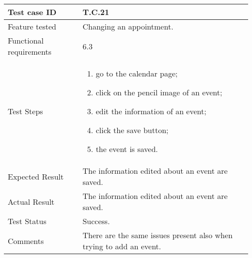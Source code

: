\begin{table}[H]
	\begin{center}
		\begin{tabular}{ | p{} | p{} | }
		\hline
		Test case ID & T.C.21\\
		\hline
		Feature tested & Changing an appointment.\\
    	\hline
		Functional requirements & 6.3  \\
		\hline
		Test Steps & 
			\begin{enumerate}
				\item go to the calendar page;
				\item click on the pencil image of an event;
				\item edit the information of an event;
				\item click the save button;
				\item the event is saved.
			\end{enumerate} \\
		\hline
		Expected Result & The information edited about an event are saved.\\
		\hline
		Actual Result & The information edited about an event are saved.\\ 
		\hline
		Test Status & \color{ForestGreen}Success.\\ 
		\hline
		Comments & There are the same issues present also when trying to add an event.\\
		\hline
		\end{tabular}
	\end{center}
\end{table}


